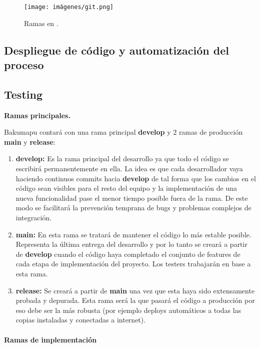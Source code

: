 \begin{figure}[H]
	\centering
	\texttt{[image: imágenes/git.png]}
	\caption{Ramas en .}
\end{figure}

\subsection{Despliegue de código y automatización del proceso}

\subsection{Testing}

\noindent\textbf{Ramas principales.}\label{flujo:ramas-principales}

\noindent Bakumapu contará con una rama principal \textbf{develop} y 2 ramas de producción \textbf{main} y \textbf{release}:

\begin{enumerate}
	\renewcommand{\labelenumi}{\alph{enumi}.}
	\item \textbf{develop:} Es la rama principal del desarrollo ya que todo el código se escribirá permanentemente en ella. La idea es que cada desarrollador vaya haciendo continuos commits hacia \textbf{develop} de tal forma que los cambios en el código sean visibles para el resto del equipo y la implementación de una nueva funcionalidad pase el menor tiempo posible fuera de la rama. De este modo se facilitará la prevención temprana de bugs y problemas complejos de integración.
	
	\item \textbf{main:} En esta rama se tratará de mantener el código lo más estable posible. Representa la última entrega del desarrollo y por lo tanto se creará a partir de \textbf{develop} cuando el código haya completado el conjunto de features de cada etapa de implementación del proyecto. Los testers trabajarán en base a esta rama.
	
	\item \textbf{release:} Se creará a partir de \textbf{main} una vez que esta haya sido extensamente probada y depurada. Esta rama será la que pasará el código a producción por eso debe ser la más robusta (por ejemplo deploys automáticos a todas las copias instaladas y conectadas a internet).
\end{enumerate}

\paragraph{Ramas de implementación}\label{pg:ramas-de-implementacion}


